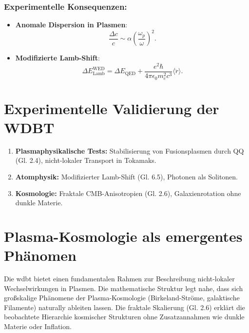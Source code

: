 \subsubsection{Experimentelle Konsequenzen:}

\begin{itemize}
    \item \textbf{Anomale Dispersion in Plasmen}:  
    \begin{equation}
    \frac{\Delta c}{c} \sim \alpha \left(\frac{\omega_p}{\omega}\right)^2.
    \end{equation}
    \item \textbf{Modifizierte Lamb-Shift}:  
    \begin{equation}
    \Delta E_{\text{Lamb}}^{\text{WED}} = \Delta E_{\text{QED}} + \frac{e^2 \hbar}{4\pi \epsilon_0 m_e^2 c^3} \langle \ddot{r} \rangle.
    \end{equation}
\end{itemize}

\section{Experimentelle Validierung der WDBT}
\label{sec:experimentelle_konsequenzen}

\begin{enumerate}
    \item \textbf{Plasmaphysikalische Tests:} Stabilisierung von Fusionsplasmen durch QQ (Gl. 2.4), nicht-lokaler Transport in Tokamaks.
    \item \textbf{Atomphysik:} Modifizierter Lamb-Shift (Gl. 6.5), Photonen als Solitonen.
    \item \textbf{Kosmologie:} Fraktale CMB-Anisotropien (Gl. 2.6), Galaxienrotation ohne dunkle Materie.
\end{enumerate}

\section{Plasma-Kosmologie als emergentes Phänomen}
Die \gls{wdbt} bietet einen fundamentalen Rahmen zur Beschreibung nicht-lokaler Wechselwirkungen in Plasmen. Die mathematische Struktur legt nahe, dass sich großskalige Phänomene der Plasma-Kosmologie
(Birkeland-Ströme, galaktische Filamente) naturally ableiten lassen. Die fraktale Skalierung (Gl. 2.6) erklärt die beobachtete Hierarchie kosmischer Strukturen ohne Zusatzannahmen wie dunkle Materie
oder Inflation.
